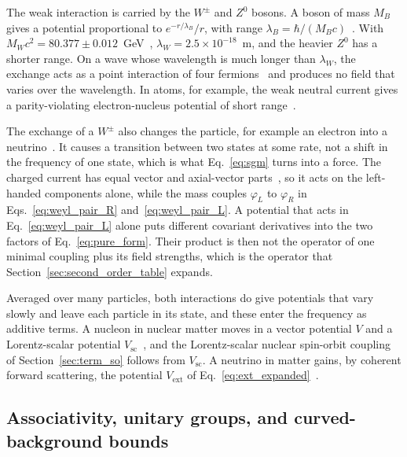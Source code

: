 \documentclass[aps,prd,onecolumn,tightenlines,nofootinbib,notitlepage,11pt,floatfix]{revtex4-2}
\theoremstyle{indentedtheorem}
\begin{document}
The weak interaction is carried by the $W^\pm$ and $Z^0$ bosons. A boson of mass $M_B$ gives a potential proportional to $e^{-r/\lambda_B}/r$, with range $\lambda_B=\hbar/(M_Bc)$~\citep{Yukawa1935Interaction}. With $M_Wc^2=80.377\pm0.012$~GeV~\citep{PDG2022Review}, $\lambda_W=2.5\times10^{-18}$~m, and the heavier $Z^0$ has a shorter range. On a wave whose wavelength is much longer than $\lambda_W$, the exchange acts as a point interaction of four fermions~\citep{FeynmanGellMann1958Theory} and produces no field that varies over the wavelength. In atoms, for example, the weak neutral current gives a parity-violating electron-nucleus potential of short range~\citep{BouchiatBouchiat1974Parity}.

The exchange of a $W^\pm$ also changes the particle, for example an electron into a neutrino~\citep{FeynmanGellMann1958Theory}. It causes a transition between two states at some rate, not a shift in the frequency of one state, which is what Eq.~\eqref{eq:sgm} turns into a force. The charged current has equal vector and axial-vector parts~\citep{FeynmanGellMann1958Theory}, so it acts on the left-handed components alone, while the mass couples $\varphi_L$ to $\varphi_R$ in Eqs.~\eqref{eq:weyl_pair_R} and~\eqref{eq:weyl_pair_L}. A potential that acts in Eq.~\eqref{eq:weyl_pair_L} alone puts different covariant derivatives into the two factors of Eq.~\eqref{eq:pure_form}. Their product is then not the operator of one minimal coupling plus its field strengths, which is the operator that Section~\ref{sec:second_order_table} expands.

Averaged over many particles, both interactions do give potentials that vary slowly and leave each particle in its state, and these enter the frequency as additive terms. A nucleon in nuclear matter moves in a vector potential $V$ and a Lorentz-scalar potential $V_\text{sc}$~\citep{Walecka1974Theory,SerotWalecka1986Relativistic}, and the Lorentz-scalar nuclear spin-orbit coupling of Section~\ref{sec:term_so} follows from $V_\text{sc}$. A neutrino in matter gains, by coherent forward scattering, the potential $V_\text{ext}$ of Eq.~\eqref{eq:ext_expanded}~\citep{Wolfenstein1978Neutrino}.

\subsection{Associativity, unitary groups, and curved-background bounds}
\label{sec:constraints}
\end{document}
